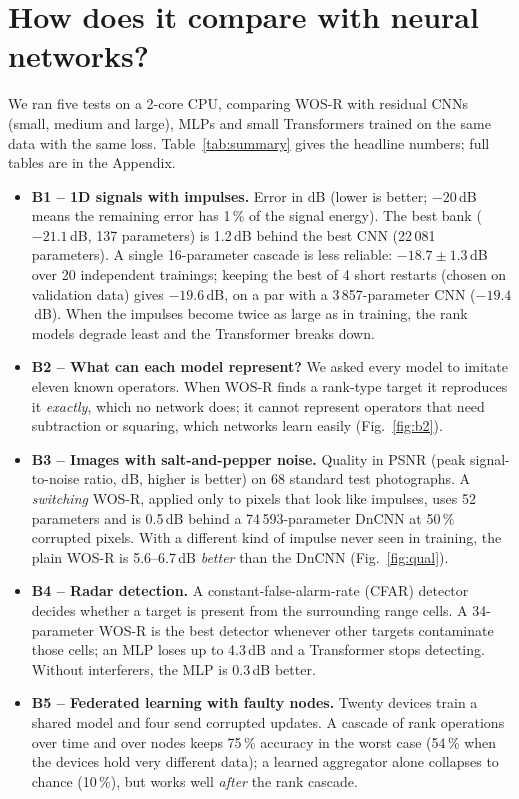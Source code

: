 \documentclass[11pt,a4paper]{article}
\begin{document}
\section{How does it compare with neural networks?}\label{sec:results}
We ran five tests on a 2-core CPU, comparing WOS-R with residual CNNs (small, medium and large), MLPs and small
Transformers trained on the same data with the same loss. Table~\ref{tab:summary} gives the headline numbers; full
tables are in the Appendix.

\begin{itemize}\itemsep1pt
\item \textbf{B1 -- 1D signals with impulses.} Error in dB (lower is better; $-20$\,dB means the remaining error has 1\,\%
  of the signal energy). The best bank ($-21.1$\,dB, 137 parameters) is 1.2\,dB behind the best CNN (22\,081
  parameters). A single 16-parameter cascade is less reliable: $-18.7\pm1.3$\,dB over 20 independent trainings; keeping
  the best of 4 short restarts (chosen on validation data) gives $-19.6$\,dB, on a par with a 3\,857-parameter CNN
  ($-19.4$\,dB). When the impulses become twice
  as large as in training, the rank models degrade least and the Transformer breaks down.
\item \textbf{B2 -- What can each model represent?} We asked every model to imitate eleven known operators. When WOS-R
  finds a rank-type target it reproduces it \emph{exactly}, which no network does; it cannot represent operators that need
  subtraction or squaring, which networks learn easily (Fig.~\ref{fig:b2}).
\item \textbf{B3 -- Images with salt-and-pepper noise.} Quality in PSNR (peak signal-to-noise ratio, dB, higher is
  better) on 68 standard test photographs. A \emph{switching} WOS-R, applied only to pixels that look like impulses, uses
  52 parameters and is 0.5\,dB behind a 74\,593-parameter DnCNN at 50\,\% corrupted pixels. With a different kind of
  impulse never seen in training, the plain WOS-R is 5.6--6.7\,dB \emph{better} than the DnCNN (Fig.~\ref{fig:qual}).
\item \textbf{B4 -- Radar detection.} A constant-false-alarm-rate (CFAR) detector decides whether a target is present
  from the surrounding range cells. A 34-parameter WOS-R is the best detector whenever other targets contaminate those
  cells; an MLP loses up to 4.3\,dB and a Transformer stops detecting. Without interferers, the MLP is 0.3\,dB better.
\item \textbf{B5 -- Federated learning with faulty nodes.} Twenty devices train a shared model and four send corrupted
  updates. A cascade of rank operations over time and over nodes keeps 75\,\% accuracy in the worst case (54\,\% when the
  devices hold very different data); a learned
  aggregator alone collapses to chance (10\,\%), but works well \emph{after} the rank cascade.
\end{itemize}
\end{document}
